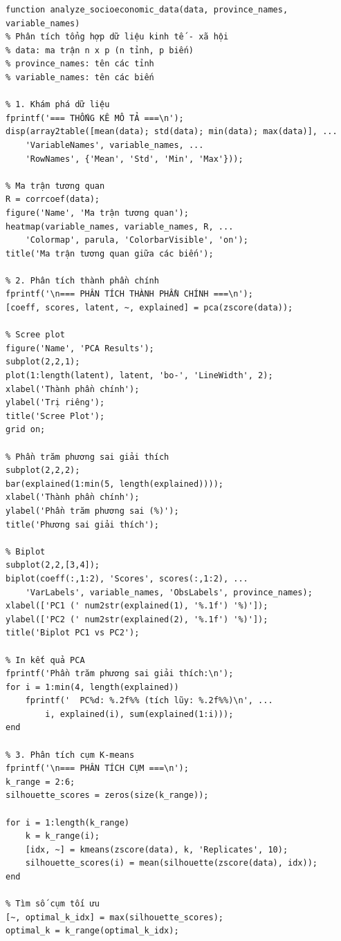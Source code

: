 \begin{matlab}
\begin{lstlisting}
function analyze_socioeconomic_data(data, province_names, variable_names)
% Phân tích tổng hợp dữ liệu kinh tế - xã hội
% data: ma trận n x p (n tỉnh, p biến)
% province_names: tên các tỉnh
% variable_names: tên các biến

% 1. Khám phá dữ liệu
fprintf('=== THỐNG KÊ MÔ TẢ ===\n');
disp(array2table([mean(data); std(data); min(data); max(data)], ...
    'VariableNames', variable_names, ...
    'RowNames', {'Mean', 'Std', 'Min', 'Max'}));

% Ma trận tương quan
R = corrcoef(data);
figure('Name', 'Ma trận tương quan');
heatmap(variable_names, variable_names, R, ...
    'Colormap', parula, 'ColorbarVisible', 'on');
title('Ma trận tương quan giữa các biến');

% 2. Phân tích thành phần chính
fprintf('\n=== PHÂN TÍCH THÀNH PHẦN CHÍNH ===\n');
[coeff, scores, latent, ~, explained] = pca(zscore(data));

% Scree plot
figure('Name', 'PCA Results');
subplot(2,2,1);
plot(1:length(latent), latent, 'bo-', 'LineWidth', 2);
xlabel('Thành phần chính');
ylabel('Trị riêng');
title('Scree Plot');
grid on;

% Phần trăm phương sai giải thích
subplot(2,2,2);
bar(explained(1:min(5, length(explained))));
xlabel('Thành phần chính');
ylabel('Phần trăm phương sai (%)');
title('Phương sai giải thích');

% Biplot
subplot(2,2,[3,4]);
biplot(coeff(:,1:2), 'Scores', scores(:,1:2), ...
    'VarLabels', variable_names, 'ObsLabels', province_names);
xlabel(['PC1 (' num2str(explained(1), '%.1f') '%)']);
ylabel(['PC2 (' num2str(explained(2), '%.1f') '%)']);
title('Biplot PC1 vs PC2');

% In kết quả PCA
fprintf('Phần trăm phương sai giải thích:\n');
for i = 1:min(4, length(explained))
    fprintf('  PC%d: %.2f%% (tích lũy: %.2f%%)\n', ...
        i, explained(i), sum(explained(1:i)));
end

% 3. Phân tích cụm K-means
fprintf('\n=== PHÂN TÍCH CỤM ===\n');
k_range = 2:6;
silhouette_scores = zeros(size(k_range));

for i = 1:length(k_range)
    k = k_range(i);
    [idx, ~] = kmeans(zscore(data), k, 'Replicates', 10);
    silhouette_scores(i) = mean(silhouette(zscore(data), idx));
end

% Tìm số cụm tối ưu
[~, optimal_k_idx] = max(silhouette_scores);
optimal_k = k_range(optimal_k_idx);


\end{lstlisting}
\end{matlab}
